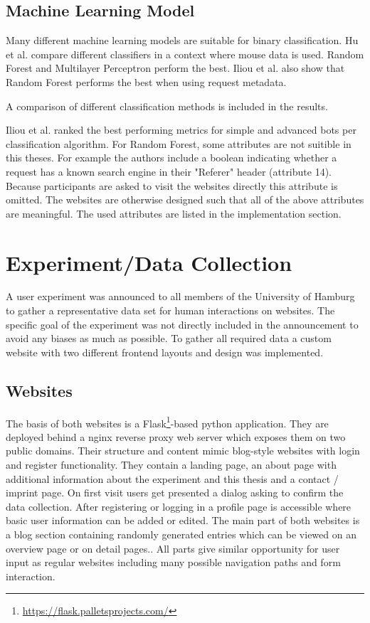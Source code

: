 \documentclass[
    fontsize=12pt,
    headings=small,
    parskip=half,           %
    bibliography=totoc,
    numbers=noenddot,       %
    open=any,               %
    final                   %
]{scrreprt}
\begin{document}
\section{Machine Learning Model}

Many different machine learning models are suitable for binary classification. Hu et al. \cite{8275816} compare different classifiers in a context where mouse data is used. Random Forest and Multilayer Perceptron perform the best.
Iliou et al. \cite{10.1145/3339252.3339267} also show that Random Forest performs the best when using request metadata.

A comparison of different classification methods is included in the results.

Iliou et al. \cite{10.1145/3339252.3339267} ranked the best performing metrics for simple and advanced bots per classification algorithm. For Random Forest, some attributes are not suitible in this theses. For example the authors include a boolean indicating whether a request has a known search engine in their "Referer" header (attribute 14). Because participants are asked to visit the websites directly this attribute is omitted. The websites are otherwise designed such that all of the above attributes are meaningful. The used attributes are listed in the implementation section.




\chapter{Experiment/Data Collection}

A user experiment was announced to all members of the University of Hamburg to gather a representative data set for human interactions on websites. The specific goal of the experiment was not directly included in the announcement to avoid any biases as much as possible. To gather all required data a custom website with two different frontend layouts and design was implemented.

\section{Websites}

The basis of both websites is a Flask\footnote{\url{https://flask.palletsprojects.com/}}-based python application. They are deployed behind a nginx reverse proxy web server which exposes them on two public domains. Their structure and content mimic blog-style websites with login and register functionality. They contain a landing page, an about page with additional information about the experiment and this thesis and a contact / imprint page.
On first visit users get presented a dialog asking to confirm the data collection.
After registering or logging in a profile page is accessible where basic user information can be added or edited. The main part of both websites is a blog section containing randomly generated entries which can be viewed on an overview page or on detail pages..
All parts give similar opportunity for user input as regular websites including many possible navigation paths and form interaction.
\end{document}
